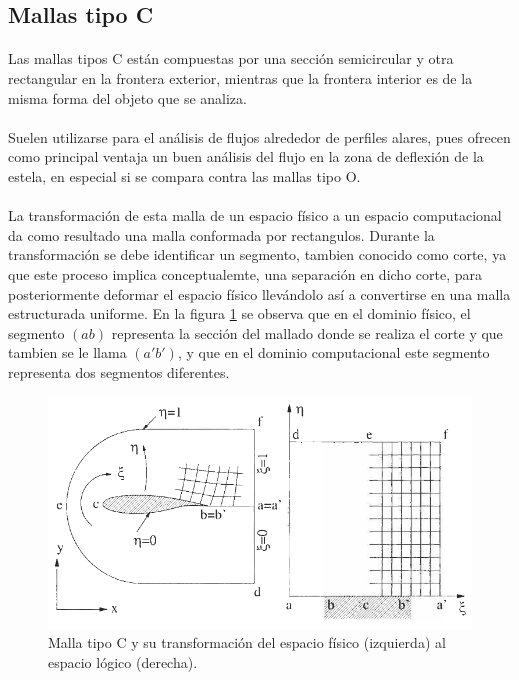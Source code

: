 \documentclass[letterpaper, openright, 12pt]{book}
\begin{document}
    \subsection{Mallas tipo C}
    \paragraph*{}
        Las mallas tipos C están compuestas por una sección semicircular y otra
        rectangular en la frontera exterior, mientras que la frontera interior
        es de la misma forma del objeto que se analiza.
    \paragraph*{}
        Suelen utilizarse para el análisis de flujos alrededor de perfiles
        alares, pues ofrecen como principal ventaja un buen análisis del flujo
        en la zona de deflexión de la estela, en especial si se compara contra
        las mallas tipo O.\cite{best-practices-grid-generation}
    \paragraph{}
        La transformación de esta malla de un espacio físico a un espacio
        computacional da como resultado una malla conformada por rectangulos.
        Durante la transformación se debe identificar un segmento, tambien
        conocido como corte, ya que este proceso implica conceptualemte, una
        separación en dicho corte, para posteriormente deformar el espacio
        físico llevándolo así a convertirse en una malla estructurada uniforme.
        En la figura \ref{fig:malla-c} se observa que en el dominio físico, el
        segmento $(ab)$ representa la sección del mallado donde se realiza el
        corte y que tambien se le llama $(a'b')$, y que en el dominio
        computacional este segmento representa dos segmentos diferentes.
            \begin{figure}[htbp!]
                \centering
                \includegraphics[width=155mm]{./Imagenes/malla-c}
                \captionsetup{justification=centering, margin=2cm}
                \caption[Malla tipo C]{Malla tipo C y su transformación del espacio físico (izquierda) al espacio lógico (derecha). \cite{blazek}}
                \label{fig:malla-c}
            \end{figure}
\end{document}

